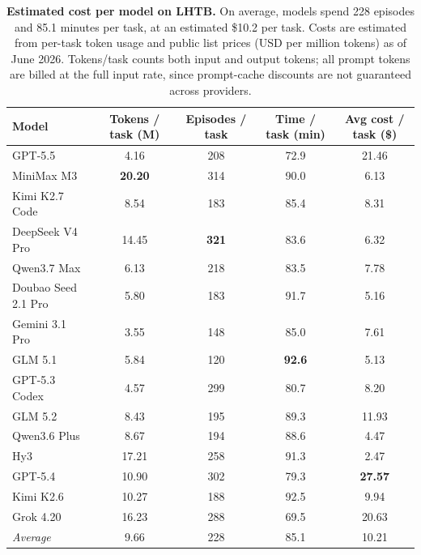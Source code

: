 \begin{table}[t]
  \centering
  \small
  \begin{tabular}{lcccc}
    \toprule
    \textbf{Model} & \textbf{Tokens / task (M)} & \textbf{Episodes / task} & \textbf{Time / task (min)} & \textbf{Avg cost / task (\$)} \\
    \midrule
    GPT-5.5               &  4.16 & 208 & 72.9 & 21.46 \\
    MiniMax M3            & \textbf{20.20} & 314 & 90.0 &  6.13 \\
    Kimi K2.7 Code        &  8.54 & 183 & 85.4 &  8.31 \\
    DeepSeek V4 Pro       & 14.45 & \textbf{321} & 83.6 &  6.32 \\
    Qwen3.7 Max           &  6.13 & 218 & 83.5 &  7.78 \\
    Doubao Seed 2.1 Pro   &  5.80 & 183 & 91.7 &  5.16 \\
    Gemini 3.1 Pro        &  3.55 & 148 & 85.0 &  7.61 \\
    GLM 5.1               &  5.84 & 120 & \textbf{92.6} &  5.13 \\
    GPT-5.3 Codex         &  4.57 & 299 & 80.7 &  8.20 \\
    GLM 5.2               &  8.43 & 195 & 89.3 & 11.93 \\
    Qwen3.6 Plus          &  8.67 & 194 & 88.6 &  4.47 \\
    Hy3                   & 17.21 & 258 & 91.3 &  2.47 \\
    GPT-5.4               & 10.90 & 302 & 79.3 & \textbf{27.57} \\
    Kimi K2.6             & 10.27 & 188 & 92.5 &  9.94 \\
    Grok 4.20             & 16.23 & 288 & 69.5 & 20.63 \\
    \midrule
    \textit{Average}      &  9.66 & 228 & 85.1 & 10.21 \\
    \bottomrule
  \end{tabular}
  \caption{\textbf{Estimated cost per model on LHTB.}
  On average, models spend 228 episodes and 85.1 minutes per task, at an estimated \$10.2 per task.
  Costs are estimated from per-task token usage and public list prices (USD per million tokens) as of June 2026.
  Tokens/task counts both input and output tokens; all prompt tokens are billed at the full input rate, since prompt-cache discounts are not guaranteed across providers.}
  \label{tab:lhtb-cost}
\end{table}
